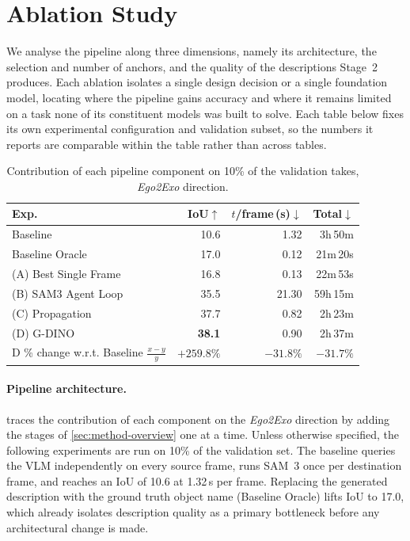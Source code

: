 \section{Ablation Study}
\label{sec:ablations}

We analyse the pipeline along three dimensions, namely its architecture, the selection and number of anchors, and the quality of the descriptions Stage~2 produces. Each ablation isolates a single design decision or a single foundation model, locating where the pipeline gains accuracy and where it remains limited on a task none of its constituent models was built to solve. Each table below fixes its own experimental configuration and validation subset, so the numbers it reports are comparable within the table rather than across tables.

\begin{table}[h]
  \centering
  \setlength{\tabcolsep}{4pt}
  \caption{Contribution of each pipeline component on 10\% of the validation takes, \textit{Ego2Exo} direction.}
  \label{tab:abl-summary}
  \begin{tabular}{lrrr}
  \toprule
  Exp. & IoU$\uparrow$ & $t$/frame\,(s)$\downarrow$ & Total$\downarrow$ \\
  \midrule
  Baseline & 10.6 & 1.32 & 3h\,50m \\
  Baseline Oracle & 17.0 & 0.12 & 21m\,20s \\
  \midrule
  (A) Best Single Frame & 16.8 & 0.13 & 22m\,53s \\
  (B) SAM3 Agent Loop & 35.5 & 21.30 & 59h\,15m \\
  (C) Propagation & 37.7 & 0.82 & 2h\,23m \\
  (D) G-DINO & \textbf{38.1} & 0.90 & 2h\,37m \\
  \midrule
  \shortstack[l]{D \% change w.r.t.\\ Baseline $\tfrac{x-y}{y}$}
    & \textcolor[rgb]{0,0.55,0}{$+259.8\%$}
    & \textcolor[rgb]{0,0.55,0}{$-31.8\%$}
    & \textcolor[rgb]{0,0.55,0}{$-31.7\%$} \\
  \bottomrule
  \end{tabular}
\end{table}

\paragraph{Pipeline architecture.}
 traces the contribution of each component on the \textit{Ego2Exo} direction by adding the stages of \cref{sec:method-overview} one at a time. Unless otherwise specified, the following experiments are run on 10\% of the validation set. The baseline queries the VLM independently on every source frame, runs SAM~3 once per destination frame, and reaches an IoU of 10.6 at 1.32\,s per frame. Replacing the generated description with the ground truth object name (Baseline Oracle) lifts IoU to 17.0, which already isolates description quality as a primary bottleneck before any architectural change is made.

